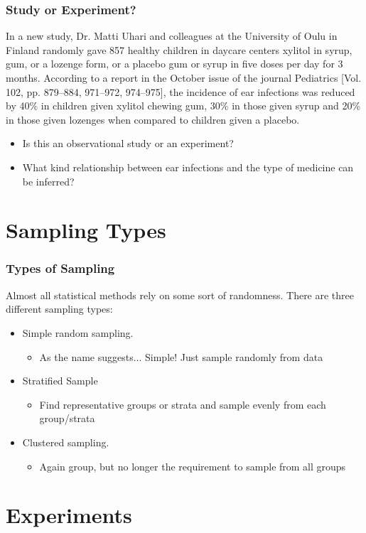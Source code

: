 \documentclass[mathserif]{beamer}
\begin{document}
\begin{frame}[t]
\frametitle{Study or Experiment?}
In a new study, Dr. Matti Uhari and colleagues at the University of Oulu in Finland randomly gave 857 healthy children in daycare centers xylitol in syrup, gum, or a lozenge form, or a placebo gum or syrup in five doses per day for 3 months. According to a report in the October issue of the journal Pediatrics [Vol. 102, pp. 879–884, 971–972, 974–975], the incidence of ear infections was reduced by 40\% in children given xylitol chewing gum, 30\% in those given syrup and 20\% in those given lozenges when compared to children given a placebo.
\begin{itemize}
\item{Is this an observational study or an experiment?}
\item{What kind relationship between ear infections and the type of medicine can be inferred?}
\end{itemize}
\end{frame}

\section{Sampling Types}

\begin{frame}[t]
\frametitle{Types of Sampling}
Almost all statistical methods rely on some sort of randomness.  There are three different sampling types:
\begin{itemize}
	\item{Simple random sampling.}
	\begin{itemize}
		\item{As the name suggests... Simple!  Just sample randomly from data}
	\end{itemize}
	\item{Stratified Sample}
	\begin{itemize}
		\item{Find representative groups or strata and sample evenly from each group/strata}
	\end{itemize}
	\item{Clustered sampling.}
	\begin{itemize}
		\item{Again group, but no longer the requirement to sample from all groups}
	\end{itemize}
\end{itemize}
\end{frame}

\section{Experiments}
\end{document}
